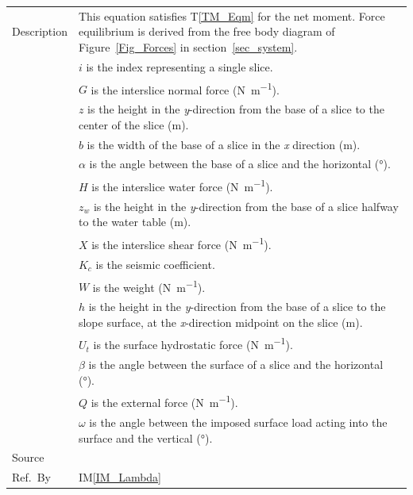 \documentclass[12pt]{article}
\newcommand{\colAwidth}{0.13\textwidth}
\newcommand{\colBwidth}{0.82\textwidth}
\newcommand{\tref}[1]{T\ref{#1}}
\newcommand{\iref}[1]{IM\ref{#1}}
\begin{document}
\begin{minipage}{\textwidth}
\begin{tabular}{| p{\colAwidth} | p{\colBwidth}|}
 \hline Description & This equation satisfies \tref{TM_Eqm} for the net moment. 
 Force equilibrium is derived from the free body diagram of 
 Figure~\ref{Fig_Forces} in section~\ref{sec_system}.\\
 &$i$ is the index representing a single slice.\\
 &$G$ is the interslice normal force (\si{\newton\per\meter}). \\
 &$z$ is the height in the \textit{y}-direction from the base of a slice 
 to the center of the slice (\si{\meter}).\\
 &$b$ is the width of the base of a slice in the \textit{x} direction 
 (\si{\meter}).\\
 &$\alpha$ is the angle between the base of a slice and the 
 horizontal (\si{\degree}). \\
 &$H$ is the interslice water force (\si{\newton\per\meter}). \\
 &$z_w$ is the height in the \textit{y}-direction from the base of a slice 
 halfway to the water table (\si{\meter}).\\
 &$X$ is the interslice shear force (\si{\newton\per\meter}). \\
 &$K_c$ is the seismic coefficient. \\
 &$W$ is the weight (\si{\newton\per\meter}). \\
 &$h$ is the height in the \textit{y}-direction from the base of a slice 
 to the slope surface, at the \textit{x}-direction midpoint on the slice 
 (\si{\meter}).\\
 &$U_t$ is the surface hydrostatic force (\si{\newton\per\meter}). \\
 &$\beta$ is the angle between the surface of a slice and the 
 horizontal (\si{\degree}). \\
 &$Q$ is the external force (\si{\newton\per\meter}). \\
 &$\omega$ is the angle between the imposed surface load acting into 
 the surface and the vertical (\si{\degree}). \\

  \hline Source & \cite{ZhuEtAl2005}\\
  
  \hline Ref.\ By & \iref{IM_Lambda}\\
  
  \hline
\end{tabular}
\end{minipage}\\
\end{document}
